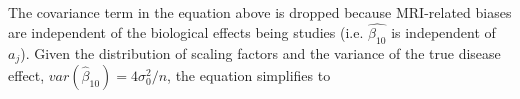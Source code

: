 The covariance term in the equation above is dropped because MRI-related biases are independent of the biological effects being studies (i.e. $\hat{\beta_{10}}$ is independent of $a_j$). Given the distribution of scaling factors and the variance of the true disease effect, $var(\hat{\beta}_{10}) = 4\sigma_0^2/n$, the equation simplifies to